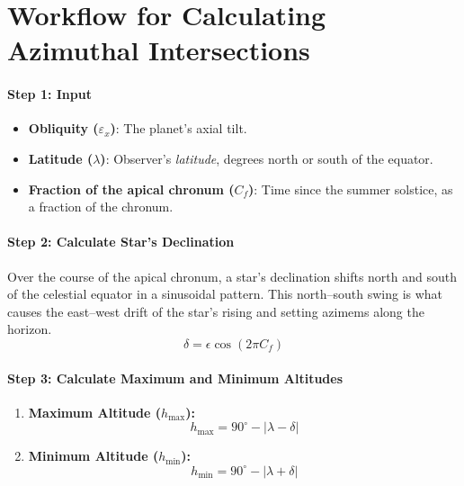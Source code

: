 \documentclass[
  letterpaper,
]{book}
\providecommand{\tightlist}{%
  \setlength{\itemsep}{0pt}\setlength{\parskip}{0pt}}
\begin{document}
\chapter{Workflow for Calculating Azimuthal
Intersections}\label{workflow-for-calculating-azimuthal-intersections}

\subsubsection{\texorpdfstring{\textbf{Step 1:
Input}}{Step 1: Input}}\label{step-1-input}

\begin{itemize}
\tightlist
\item
  \textbf{Obliquity (\(\varepsilon_x\))}: The planet's axial tilt.
\item
  \textbf{Latitude (\(\lambda\))}: Observer's \emph{latitude}, degrees
  north or south of the equator.
\item
  \textbf{Fraction of the apical chronum (\(C_f\))}: Time since the
  summer solstice, as a fraction of the chronum.
\end{itemize}

\subsubsection{\texorpdfstring{\textbf{Step 2: Calculate Star's
Declination}}{Step 2: Calculate Star's Declination}}\label{step-2-calculate-stars-declination}

Over the course of the apical chronum, a star's declination shifts north
and south of the celestial equator in a sinusoidal pattern. This
north--south swing is what causes the east--west drift of the star's
rising and setting azimems along the horizon. \[
\delta = \epsilon \cos(2 \pi C_f)
\]

\subsubsection{\texorpdfstring{\textbf{Step 3: Calculate Maximum and
Minimum
Altitudes}}{Step 3: Calculate Maximum and Minimum Altitudes}}\label{step-3-calculate-maximum-and-minimum-altitudes}

\begin{enumerate}
\def\labelenumi{\arabic{enumi}.}
\item
  \textbf{Maximum Altitude (\(h_\text{max}\)):} \[
  h_\text{max} = 90^\circ - |\lambda - \delta|
  \]
\item
  \textbf{Minimum Altitude (\(h_\text{min}\)):} \[
  h_\text{min} = 90^\circ - |\lambda + \delta|
  \]
\end{enumerate}
\end{document}
